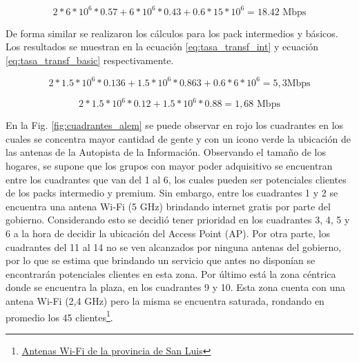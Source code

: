 \documentclass[11pt,a4paper]{article}
\begin{document}
\begin{equation}
  2*6*{10}^6*0.57+6*{10}^6*0.43+0.6*15*{10}^6=18.42 \text{ Mbps}
  \label{eq:tasa_transf_premium}
\end{equation}


De forma similar se realizaron los cálculos para los pack intermedios y básicos. 
Los resultados se muestran en la ecuación \ref{eq:tasa_transf_int} y ecuación \ref{eq:tasa_transf_basic} respectivamente. 


\begin{equation}
 2*1.5*{10}^6*0.136+1.5*{10}^6*0.863+ 0.6*6*{10}^6=5,3 \text{Mbps} 
 \label{eq:tasa_transf_int}
\end{equation}

\begin{equation}
 2*1.5*{10}^6*0.12+1.5*{10}^6*0.88=1,68 \text{ Mbps}
 \label{eq:tasa_transf_basic}
\end{equation}
 

 En la Fig. \ref{fig:cuadrantes_alem} se puede observar en rojo los cuadrantes en los cuales se concentra mayor cantidad de gente y con un icono verde la ubicación de las antenas de la Autopista de la Información. 
 Observando el tamaño de los hogares, se supone que los grupos con mayor poder adquisitivo se encuentran entre los cuadrantes que van del 1 al 6, los cuales pueden ser potenciales clientes de los packs intermedio y premium. 
 Sin embargo, entre los cuadrantes 1 y 2 se encuentra una antena Wi-Fi (5 GHz) brindando internet gratis por parte del gobierno. 
 Considerando esto se decidió tener prioridad en los cuadrantes 3, 4, 5 y 6 a la hora de decidir la ubicación del Access Point (AP). Por otra parte, los cuadrantes del 11 al 14 no se ven alcanzados por ninguna antenas del gobierno, por lo que se estima que brindando un servicio que antes no disponían se encontrarán potenciales clientes en esta zona. 
 Por último está la zona céntrica donde se encuentra la plaza, en los cuadrantes 9 y 10. Esta zona cuenta con una antena Wi-Fi (2,4 GHz) pero la misma se encuentra saturada, rondando en promedio los 45 clientes\footnote{\href{http://wifi.sanluis.gov.ar/}{Antenas Wi-Fi de la provincia de San Luis}}.
\end{document}
